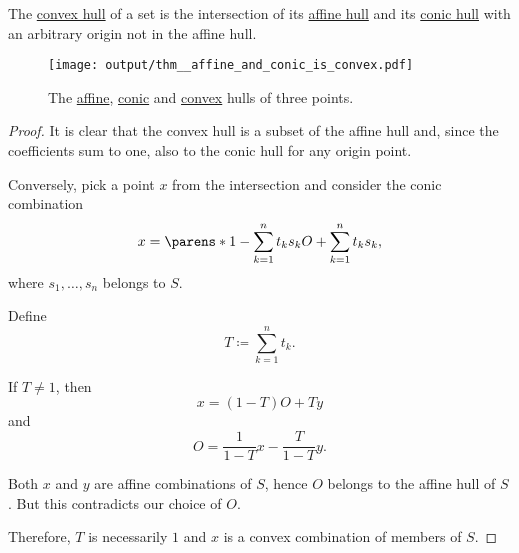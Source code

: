 \begin{proposition}\label{thm:affine_and_conic_is_convex}
  The \hyperref[def:convex_hull]{convex hull} of a set is the intersection of its \hyperref[def:affine_hull]{affine hull} and its \hyperref[def:conic_hull]{conic hull} with an arbitrary origin not in the affine hull.

  \begin{figure}[!ht]
    \centering
    \texttt{[image: output/thm\_\_affine\_and\_conic\_is\_convex.pdf]}
    \caption{The \hyperref[def:affine_hull]{affine}, \hyperref[def:conic_hull]{conic} and \hyperref[def:convex_hull]{convex} hulls of three points.}\label{fig:thm:affine_and_conic_is_convex}
  \end{figure}
\end{proposition}
\begin{proof}
  It is clear that the convex hull is a subset of the affine hull and, since the coefficients sum to one, also to the conic hull for any origin point.

  Conversely, pick a point \( x \) from the intersection and consider the conic combination
  \begin{equation*}
    x = \parens*{ 1 - \sum_{k=1}^n t_k s_k } O + \sum_{k=1}^n t_k s_k,
  \end{equation*}
  where \( s_1, \ldots, s_n \) belongs to \( S \).

  Define
  \begin{equation*}
    T \coloneqq \sum_{k=1}^n t_k.
  \end{equation*}

  If \( T \neq 1 \), then
  \begin{equation*}
    x = (1 - T) O + T y
  \end{equation*}
  and
  \begin{equation*}
    O = \frac 1 {1 - T} x - \frac T {1 - T} y.
  \end{equation*}

  Both \( x \) and \( y \) are affine combinations of \( S \), hence \( O \) belongs to the affine hull of \( S \). But this contradicts our choice of \( O \).

  Therefore, \( T \) is necessarily \( 1 \) and \( x \) is a convex combination of members of \( S \).
\end{proof}

